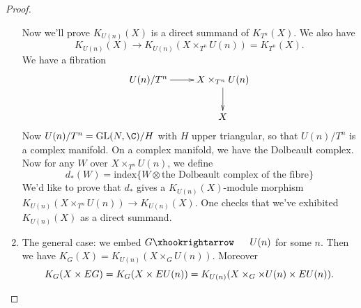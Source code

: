 \documentclass[11pt]{article}
\begin{document}
\begin{GuozhenEqKthyPractice}
\begin{proof}
\begin{enumerate}
Now we'll prove $K_{U(n)}(X)$ is a direct summand of $K_{T^n}(X)$. We also have
\[K_{U(n)}(X)\to K_{U(n)}(X\times_{T^n} U(n))=K_{T^n}(X).\]  
We have a fibration
\[\xymatrix{U(n)/T^n\ar[r] &X\times_{T^n}U(n)\ar[d]\\
&X}\]
Now $U(n)/T^n=\GL(N,\C)/H$ with $H$ upper triangular, so that $U(n)/T^n$ is a complex manifold. On a complex manifold, we have the Dolbeault complex. Now for any $W$ over $X\times_{T^n}U(n)$, we define
\[d_*(W)=\text{index}\{W\otimes\text{the Dolbeault complex of the fibre}\}\]
We'd like to prove that $d_*$ gives a $K_{U(n)}(X)$-module morphism $K_{U(n)}(X\times_{T^n}U(n))\to K_{U(n)}(X)$. One checks that we've exhibited $K_{U(n)}(X)$ as a direct summand.
\item The general case: we embed $G\cofibration U(n)$ for some $n$. Then we have $K_G(X)=K_{U(n)}(X\times_G U(n))$. Moreover
\[K_G(X\times EG)=K_G(X\times EU(n))=K_{U(n)}(X\times_G\times U(n)\times EU(n)).\qedhere\]
\end{enumerate}
\end{proof}

\pagebreak
\end{GuozhenEqKthyPractice}
\end{document}
